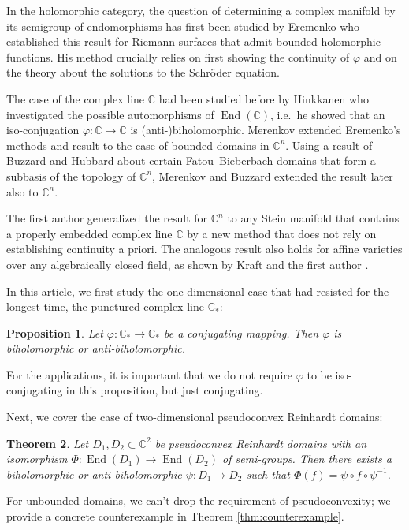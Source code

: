 \documentclass[a4paper,12pt]{amsart}
\newcommand{\CC}{\mathbb{C}}
\DeclareMathOperator{\enmo}{End}
\newtheorem{theorem}{Theorem}[section]
\newtheorem{proposition}[theorem]{Proposition}
\theoremstyle{definition}
\begin{document}
In the holomorphic category, the question of determining a complex manifold by its semigroup of endomorphisms has first been studied by Eremenko \cite{00370670} who established this result for Riemann surfaces that admit bounded holomorphic functions. His method crucially relies on first showing the continuity of $\varphi$ and on the theory about the solutions to the Schröder equation.

The case of the complex line $\CC$ had been studied before by Hinkkanen \cite{00126289} who investigated the possible automorphisms of $\enmo(\CC)$, i.e.\ he showed that an iso-conjugation $\varphi \colon \CC \to \CC$ is (anti-)biholomorphic. Merenkov \cite{01721089} extended Eremenko's methods and result to the case of bounded domains in $\CC^n$. Using a result of Buzzard and Hubbard \cite{01463210} about certain Fatou--Bieberbach domains that form a subbasis of the topology of $\CC^n$, Merenkov and Buzzard \cite{MR2010321} extended the result later also to $\CC^n$.

The first author generalized the result for $\CC^n$ to any Stein manifold that contains a properly embedded complex line $\CC$ \cite{MR2763719} by a new method that does not rely on establishing continuity a priori. The analogous result also holds for affine varieties over any algebraically closed field, as shown by Kraft and the first author \cite{06350076}.

In this article, we first study the one-dimensional case that had resisted for the longest time, the punctured complex line $\CC_\ast$:
\begin{proposition}
Let $\varphi \colon \CC_\ast \to \CC_\ast$ be a conjugating mapping. Then $\varphi$ is biholomorphic or anti-biholomorphic.
\end{proposition}
For the applications, it is important that we do not require $\varphi$ to be iso-conjugating in this proposition, but just conjugating.

Next, we cover the case of two-dimensional pseudoconvex Reinhardt domains:
\begin{theorem}\label{theorem-reinhardt}
Let $D_1, D_2 \subset \CC^2$ be pseudoconvex Reinhardt domains with an isomorphism $\Phi \colon \enmo(D_1) \to \enmo(D_2)$ of semi-groups. Then there exists a biholomorphic or anti-biholomorphic  $\psi \colon D_1 \to D_2$ such that $\Phi(f) = \psi \circ f \circ \psi^{-1}$. 
\end{theorem}

For unbounded domains, we can't drop the requirement of pseudoconvexity; we provide a concrete counterexample in Theorem \ref{thm:counterexample}.
\end{document}
